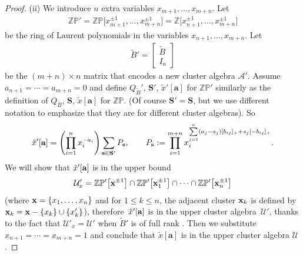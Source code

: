 \documentclass[pdftex]{sigma}
\numberwithin{equation}{section}
\begin{document}
\begin{proof}
(ii) We introduce $n$ extra variables $x_{m+1},\dots, x_{m+n}$. Let
\begin{gather*}
\mathbb{ZP'}=
\mathbb{ZP}\big[x_{m+1}^{\pm1},\dots,x_{m+n}^{\pm1}\big]=
\mathbb{Z}\big[x_{n+1}^{\pm1},\dots,x_{m+n}^{\pm1}\big]
\end{gather*}
 be the ring of Laurent polynomials in the variables $x_{n+1},\dots,x_{m+n}$. Let
\begin{gather*}
\tilde{B}'=\begin{bmatrix}\tilde{B}\\I_n\end{bmatrix}
 \end{gather*}
 be the $(m+n)\times n$ matrix that encodes a new cluster algebra $\mathcal{A}'$. Assume $a_{n+1}=\cdots=a_{m+n}=0$ and
def\/ine $Q_{\tilde B}'$, $\mathbf{S}'$, $\tilde{x}'[\mathbf{a}]$ for $\mathbb{ZP}'$ similarly as the def\/inition of $Q_{\tilde B}$, $\mathbf{S}$, $\tilde{x}[\mathbf{a}]$ for $\mathbb{ZP}$. (Of course $\mathbf{S}'=\mathbf{S}$, but we use dif\/ferent notation to emphasize that they are for dif\/ferent cluster algebras). So
\begin{gather*}
\tilde{x}'[\mathbf{a}]=\left(\prod_{i=1}^n  x_i^{-a_i}\right)\sum_{{\bf s}\in {\bf S}'}P_{\bf s}, \qquad P_{\bf s}:=\prod_{i=1}^{m+n}
x_i^{\sum\limits_{j=1}^n (a_j-s_j)[b_{ij}]_+ + s_j[-b_{ij}]_+}.
\end{gather*}
We will show that $\tilde{x}'[{\bf a}]$ is in the upper bound
\begin{gather*}
\mathcal{U}'_x=\mathbb{ZP'}\big[{\bf x}^{\pm1}\big]\cap\mathbb{ZP'}\big[{\bf x}_1^{\pm1}\big]\cap\cdots\cap\mathbb{ZP'}\big[{\bf x}_n^{\pm1}\big]
\end{gather*}
(where ${\bf x}=\{x_1,\dots,x_n\}$ and for $1\le k\le n$, the adjacent cluster ${\bf x}_k$ is def\/ined by ${\bf x}_k={\bf x}-\{x_k\}\cup \{x_k'\}$), therefore~$\tilde{x}'[{\bf a}]$ is in the upper cluster algebra~$\mathcal{U}'$, thanks to the fact that $\mathcal{U}'_x=\mathcal{U}'$ when $\tilde{B}'$ is of full rank \cite[Corollary~1.7 and Proposition~1.8]{BFZ}. Then we substitute $x_{n+1}=\cdots=x_{m+n}=1$ and conclude that $\tilde{x}[\mathbf{a}]$ is in the upper cluster algebra $\mathcal{U}$.


\end{proof}
\end{document}
